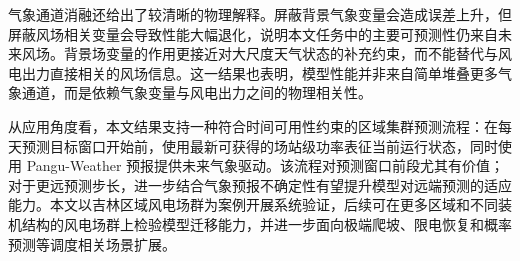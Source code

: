 气象通道消融还给出了较清晰的物理解释。屏蔽背景气象变量会造成误差上升，但屏蔽风场相关变量会导致性能大幅退化，说明本文任务中的主要可预测性仍来自未来风场。背景场变量的作用更接近对大尺度天气状态的补充约束，而不能替代与风电出力直接相关的风场信息。这一结果也表明，模型性能并非来自简单堆叠更多气象通道，而是依赖气象变量与风电出力之间的物理相关性。

从应用角度看，本文结果支持一种符合时间可用性约束的区域集群预测流程：在每天预测目标窗口开始前，使用最新可获得的场站级功率表征当前运行状态，同时使用 Pangu-Weather 预报提供未来气象驱动。该流程对预测窗口前段尤其有价值；对于更远预测步长，进一步结合气象预报不确定性有望提升模型对远端预测的适应能力。本文以吉林区域风电场群为案例开展系统验证，后续可在更多区域和不同装机结构的风电场群上检验模型迁移能力，并进一步面向极端爬坡、限电恢复和概率预测等调度相关场景扩展。
